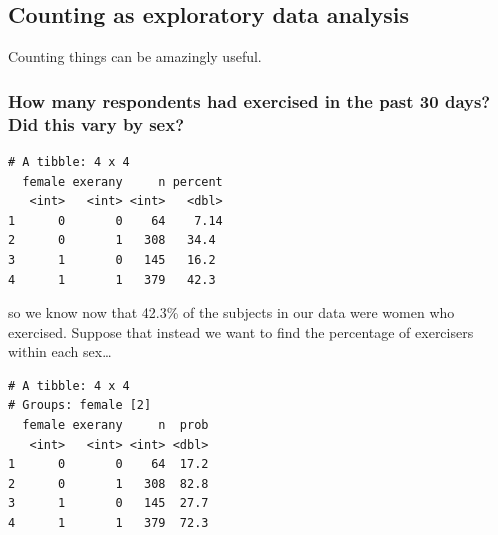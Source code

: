 \documentclass[]{book}
\newenvironment{Shaded}{\begin{snugshade}}{\end{snugshade}}
\newcommand{\KeywordTok}[1]{\textcolor[rgb]{0.13,0.29,0.53}{\textbf{#1}}}
\newcommand{\DataTypeTok}[1]{\textcolor[rgb]{0.13,0.29,0.53}{#1}}
\newcommand{\DecValTok}[1]{\textcolor[rgb]{0.00,0.00,0.81}{#1}}
\newcommand{\StringTok}[1]{\textcolor[rgb]{0.31,0.60,0.02}{#1}}
\newcommand{\OperatorTok}[1]{\textcolor[rgb]{0.81,0.36,0.00}{\textbf{#1}}}
\newcommand{\NormalTok}[1]{#1}
\theoremstyle{definition}
\theoremstyle{definition}
\theoremstyle{definition}
\theoremstyle{remark}
\begin{document}
\subsection{Counting as exploratory data
analysis}\label{counting-as-exploratory-data-analysis}

Counting things can be amazingly useful.

\subsubsection{How many respondents had exercised in the past 30 days?
Did this vary by
sex?}\label{how-many-respondents-had-exercised-in-the-past-30-days-did-this-vary-by-sex}

\begin{Shaded}
\end{Shaded}

\begin{verbatim}
# A tibble: 4 x 4
  female exerany     n percent
   <int>   <int> <int>   <dbl>
1      0       0    64    7.14
2      0       1   308   34.4 
3      1       0   145   16.2 
4      1       1   379   42.3 
\end{verbatim}

so we know now that 42.3\% of the subjects in our data were women who
exercised. Suppose that instead we want to find the percentage of
exercisers within each sex\ldots{}

\begin{Shaded}
\end{Shaded}

\begin{verbatim}
# A tibble: 4 x 4
# Groups: female [2]
  female exerany     n  prob
   <int>   <int> <int> <dbl>
1      0       0    64  17.2
2      0       1   308  82.8
3      1       0   145  27.7
4      1       1   379  72.3
\end{verbatim}
\end{document}
